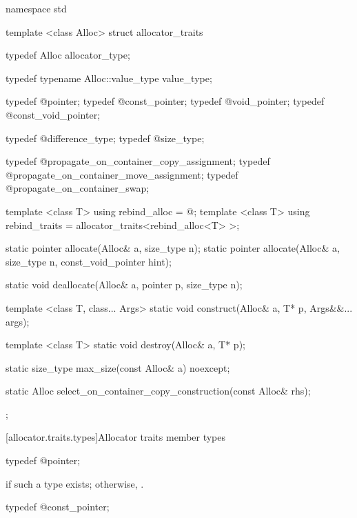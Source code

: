 %
\begin{codeblock}
namespace std {
  template <class Alloc> struct allocator_traits {
    typedef Alloc allocator_type;

    typedef typename Alloc::value_type value_type;

    typedef @\seebelow@ pointer;
    typedef @\seebelow@ const_pointer;
    typedef @\seebelow@ void_pointer;
    typedef @\seebelow@ const_void_pointer;

    typedef @\seebelow@ difference_type;
    typedef @\seebelow@ size_type;

    typedef @\seebelow@ propagate_on_container_copy_assignment;
    typedef @\seebelow@ propagate_on_container_move_assignment;
    typedef @\seebelow@ propagate_on_container_swap;

    template <class T> using rebind_alloc = @\seebelow@;
    template <class T> using rebind_traits = allocator_traits<rebind_alloc<T> >;

    static pointer allocate(Alloc& a, size_type n);
    static pointer allocate(Alloc& a, size_type n, const_void_pointer hint);

    static void deallocate(Alloc& a, pointer p, size_type n);

    template <class T, class... Args>
      static void construct(Alloc& a, T* p, Args&&... args);

    template <class T>
      static void destroy(Alloc& a, T* p);

    static size_type max_size(const Alloc& a) noexcept;

    static Alloc select_on_container_copy_construction(const Alloc& rhs);
  };
}
\end{codeblock}

[allocator.traits.types]{Allocator traits member types}

%
%
\begin{itemdecl}
typedef @\seebelow@ pointer;
\end{itemdecl}

\begin{itemdescr}
\pnum
\ctype {} if such a type exists; otherwise, .
\end{itemdescr}

%
%
\begin{itemdecl}
typedef @\seebelow@ const_pointer;
\end{itemdecl}

